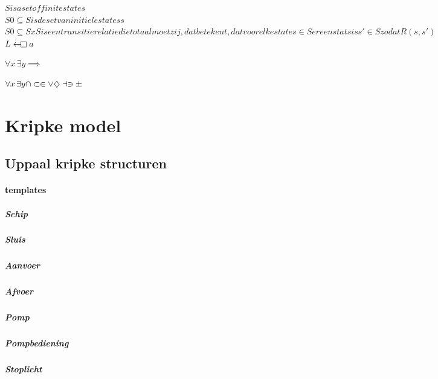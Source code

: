 $S is a set of finite states$\\
$S0 \subseteq S is de set van initiele statess$ \\
$S0 \subseteq S xS  is een transitie relatie die totaal moet zij, dat betekent, dat voor elke state s \in S er een stats is s' \in S zodat R(s,s')$
$L\gets\mathrel{\mkern-2.4mu\mathop\square} a$

$\forall x\,\exists y \implies $

$\forall x\,\exists y \cap \subset \in \vee \diamondsuit \dashv \ni \pm$


\chapter{Kripke model}

\section{Uppaal kripke structuren}


\subsubsection{templates}

\paragraph{Schip}

\paragraph{Sluis}


\paragraph{Aanvoer}


\paragraph{Afvoer}

\paragraph{Pomp}

\paragraph{Pompbediening}


\paragraph{Stoplicht}

